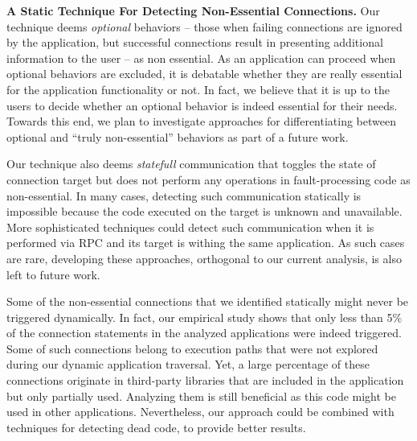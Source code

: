 \vspace{0.1in}
\noindent 
{\bf A Static Technique For Detecting Non-Essential Connections.}
Our technique deems \emph{optional} behaviors -- those when failing connections are ignored by the application, but successful connections result in presenting additional information to the user -- as non essential. 
As an application can proceed when optional behaviors are excluded, it is debatable whether they are really essential for the application functionality or not. In fact, we believe that it is up to the users to decide whether an optional behavior is indeed essential for their needs. Towards this end, we plan to investigate approaches for differentiating between optional and ``truly non-essential'' behaviors as part of a future work. 

Our technique also deems \emph{statefull} communication that toggles the state of connection target but does not perform any operations in fault-processing code as non-essential. In many cases, detecting such communication statically is impossible because the code executed on the target is unknown and unavailable. 
More sophisticated techniques could detect such communication when it is performed via RPC and its target is withing the same application. As such cases are rare, developing these approaches, orthogonal to our current analysis, is also left to future work. 
 
Some of the non-essential connections that we identified statically might never be triggered dynamically. In fact, our empirical study shows that only less than 5\% of the connection statements in the analyzed applications were indeed triggered.
Some of such connections belong to execution paths that were not explored during our dynamic application traversal.
Yet, a large percentage of these connections originate in  
third-party libraries that are included in the application but only partially used. 
Analyzing them is still beneficial as this code might be used in other applications.
Nevertheless, our approach could be combined with techniques for detecting dead code, to provide better results.

